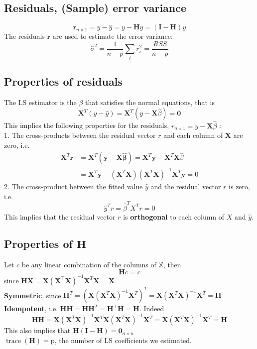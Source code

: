 \documentclass[11pt,a4paper]{article}
\begin{document}
\subsection{Residuals, (Sample) error variance}
$$
\mathbf{r}_{n \times 1}=y-\hat{y}=y-\mathbf{H} y=(\mathbf{I}-\mathbf{H}) y
$$
The residuals $\mathbf{r}$ are used to estimate the error variance:
$$
\hat{\sigma}^2=\frac{1}{n-p} \sum_{i} r_{i}^{2}=\frac{R S S}{n-p}
$$

\subsection{Properties of residuals}
The LS estimator is the $\beta$ that satisfies the normal equations, that is
$$
\mathbf{X}^{T}(y-\hat{y})=\mathbf{X}^{T}(y-\mathbf{X} \hat{\beta})=\mathbf{0}
$$
This implies the following properties for the residuals, $r_{n \times 1}=y-\mathbf{X} \hat{\beta}$ :\\
1. The cross-products between the residual vector $r$ and each column of $\mathbf{X}$ are zero, i.e.
$$
\begin{aligned}
\mathbf{X}^{T} \boldsymbol{r} &=\mathbf{X}^{T}(\boldsymbol{y}-\mathbf{X} \hat{\boldsymbol{\beta}})=\mathbf{X}^{T} \boldsymbol{y}-\mathbf{X}^{T} \mathbf{X} \hat{\beta} \\
&=\mathbf{X}^{T} \boldsymbol{y}-\left(\mathbf{X}^{T} \mathbf{X}\right)\left(\mathbf{X}^{T} \mathbf{X}\right)^{-1} \mathbf{X}^{T} \boldsymbol{y}=0
\end{aligned}
$$
2. The cross-product between the fitted value $\hat{y}$ and the residual vector $r$ is zero, i.e.
$$
\hat{y}^{T} r=\hat{\beta}^{T} X^{T} r=0
$$
This implies that the residual vector $r$ is \textbf{orthogonal} to each column of $X$ and $\hat{y}$.\\
\subsection{Properties of $\mathbf{H}$}
Let $c$ be any linear combination of the columns of $\mathbb{X}$, then
$$
\mathbf{H} c=c
$$
since $\mathbf{H X}=\mathbf{X}\left(\mathbf{X}^{\top} \mathbf{X}\right)^{-1} \mathbf{X}^{T} \mathbf{X}=\mathbf{X}$\\

\textbf{Symmetric}, since $\mathbf{H}^{T}=\left(\mathbf{X}\left(\mathbf{X}^{T} \mathbf{X}\right)^{-1} \mathbf{X}^{T}\right)^{T}=\mathbf{X}\left(\mathbf{X}^{T} \mathbf{X}\right)^{-1} \mathbf{X}^{T}=\mathbf{H}$\\
\textbf{Idempotent}, i.e. $\mathbf{H H}=\mathbf{H H}^{T}=\mathbf{H}^{\top} \mathbf{H}=\mathbf{H} .$ Indeed
$$
\mathbf{H H}=\mathbf{X}\left(\mathbf{X}^{T} \mathbf{X}\right)^{-1} \mathbf{X}^{T} \mathbf{X}\left(\mathbf{X}^{T} \mathbf{X}\right)^{-1} \mathbf{X}^{T}=\mathbf{X}\left(\mathbf{X}^{T} \mathbf{X}\right)^{-1} \mathbf{X}^{T}=\mathbf{H}
$$
This also implies that $\mathbf{H}(\mathbf{I}-\mathbf{H})=\mathbf{0}_{n \times n}$\\
$\operatorname{trace}(\mathbf{H})=\mathrm{p}$, the number of $\mathrm{LS}$ coefficients we estimated.
\end{document}
